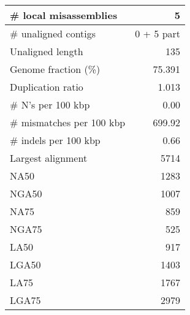 \documentclass[12pt,a4paper]{article}
\begin{document}
\begin{table}[ht]
\begin{center}
\begin{tabular}{|l*{1}{|r}|}
\# local misassemblies & 5 \\ \hline
\# unaligned contigs & 0 + 5 part \\ \hline
Unaligned length & 135 \\ \hline
Genome fraction (\%) & 75.391 \\ \hline
Duplication ratio & 1.013 \\ \hline
\# N's per 100 kbp & 0.00 \\ \hline
\# mismatches per 100 kbp & 699.92 \\ \hline
\# indels per 100 kbp & 0.66 \\ \hline
Largest alignment & 5714 \\ \hline
NA50 & 1283 \\ \hline
NGA50 & 1007 \\ \hline
NA75 & 859 \\ \hline
NGA75 & 525 \\ \hline
LA50 & 917 \\ \hline
LGA50 & 1403 \\ \hline
LA75 & 1767 \\ \hline
LGA75 & 2979 \\ \hline
\end{tabular}
\end{center}
\end{table}
\end{document}
